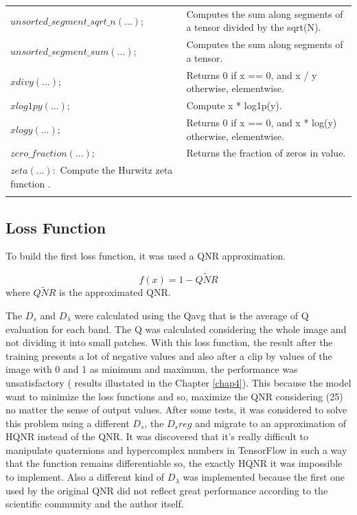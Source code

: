 \documentclass[12pt]{report}
\begin{document}
\begin{longtable}{ p{} | p{}}
$unsorted\_segment\_sqrt\_n(...);$ & Computes the sum along segments of a tensor divided by the sqrt(N). \\ 

$unsorted\_segment\_sum(...);$ & Computes the sum along segments of a tensor. \\ 

$xdivy(...);$ & Returns 0 if x == 0, and x / y otherwise, elementwise. \\ 

$xlog1py(...);$ & Compute x * log1p(y). \\ 

$xlogy(...);$ & Returns 0 if x == 0, and x * log(y) otherwise, elementwise. \\ 

$zero\_fraction(...);$ & Returns the fraction of zeros in value. \\ 

$zeta(...):$ Compute the Hurwitz zeta function . \\ 

\hline
\label{tab:tensorflowapi}
\end{longtable}

\restoregeometry

\subsection{Loss Function}

To build the first loss function, it was used a QNR approximation. 

\begin{equation}
    f(x) = 1 - \widetilde{QNR}
    \label{loss}
\end{equation}
%
where $\widetilde{QNR}$ is the approximated QNR.

The $D_s$ and $D_\lambda$ were calculated using the Qavg that is the average of Q evaluation for each band. The Q was calculated considering the whole image and not
dividing it into small patches.
With this loss function, the result after the training presents a lot of negative values and also after a clip
by values of the image with 0 and 1 as minimum and maximum, the performance was unsatisfactory ( results illustated in the Chapter \ref{chap4}).
This because the model want to minimize the loss functions and so, maximize the QNR considering (25) no matter 
the sense of output values.
After some tests, it was considered to solve this problem using a different $D_s$, the $D_sreg$ \cite{dsreg} 
and migrate to an approximation of HQNR instead of the QNR.
It was discovered that it's really difficult to manipulate quaternions and hypercomplex numbers in TensorFlow in such
a way that the function remains differentiable so, the exactly HQNR it was impossible to implement.  
Also a different kind of $D_\lambda$ was implemented because the first one used by the original 
QNR did not reflect great performance according to the scientific community and the author itself.
\end{document}
